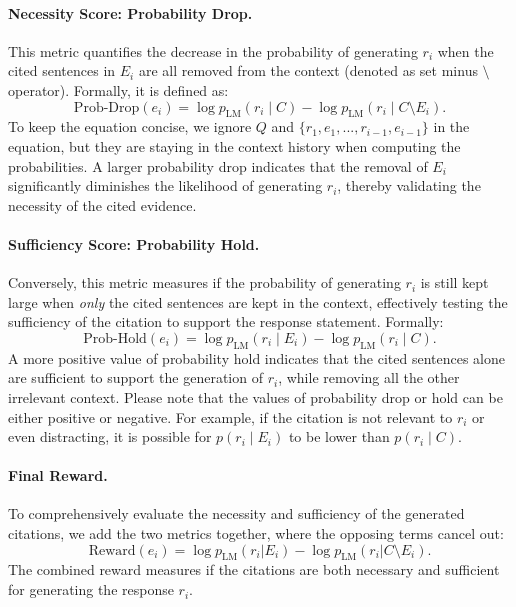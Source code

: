 \paragraph{Necessity Score: Probability Drop.} This metric quantifies the decrease in the probability of generating $r_i$ when the cited sentences in $E_i$ are all removed from the context (denoted as set minus $\setminus$ operator). Formally, it is defined as:
\[
\text{Prob-Drop}(e_i) = \log p_{\text{LM}}(r_i \mid C) - \log p_{\text{LM}}\left(r_i \mid C \setminus E_i\right).
\]
To keep the equation concise, we ignore $Q$ and $\{r_1, e_1, ..., r_{i-1}, e_{i-1}\}$ in the equation, but they are staying in the context history when computing the probabilities.
A larger probability drop indicates that the removal of $E_i$ significantly diminishes the likelihood of generating $r_i$, thereby validating the necessity of the cited evidence.

\paragraph{Sufficiency Score: Probability Hold.} Conversely, this metric measures if the probability of generating $r_i$ is still kept large when \emph{only} the cited sentences are kept in the context, effectively testing the sufficiency of the citation to support the response statement. Formally:
\[
\text{Prob-Hold}(e_i) = \log p_{\text{LM}}\left(r_i \mid E_i\right) - \log p_{\text{LM}}(r_i \mid C).
\]
A more positive value of probability hold indicates that the cited sentences alone are sufficient to support the generation of $r_i$, while removing all the other irrelevant context. Please note that the values of probability drop or hold can be either positive or negative. For example, if the citation is not relevant to $r_i$ or even distracting, it is possible for $p(r_i \mid E_i)$ to be lower than $p(r_i \mid C)$.

\paragraph{Final Reward.} To comprehensively evaluate the necessity and sufficiency of the generated citations, we add the two metrics together, where the opposing terms cancel out:
\begin{equation}
\label{eq:reward}
\text{Reward}(e_i) = \log p_{\text{LM}}\left(r_i | E_i\right) - \log p_{\text{LM}}\left(r_i | C \setminus E_i\right).
\end{equation}
The combined reward measures if the citations are both necessary and sufficient for generating the response $r_i$.

